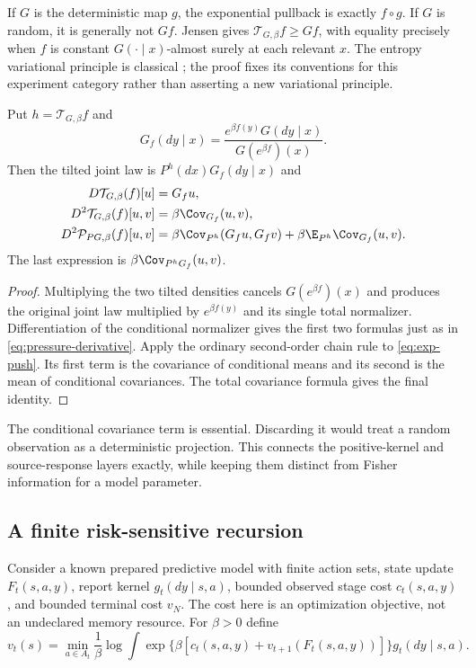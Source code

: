 If $G$ is the deterministic map $g$, the exponential pullback is exactly
$f\circ g$. If $G$ is random, it is generally not $Gf$. Jensen gives
$\mathcal T_{G,\beta}f\ge Gf$, with equality precisely when $f$ is
constant $G(\cdot\mid x)$-almost surely at each relevant $x$.
The entropy variational principle is classical
\cite{DupuisWang2007}; the proof fixes its conventions for this experiment
category rather than asserting a new variational principle.

\begin{proposition}
\label{prop:pressure-chain}
Put $h=\mathcal T_{G,\beta}f$ and
\[
 G_f(dy\mid x)=\frac{e^{\beta f(y)}G(dy\mid x)}{G(e^{\beta f})(x)}.
\]
Then the tilted joint law is $P^h(dx)G_f(dy\mid x)$ and
\begin{align*}
 D\mathcal T_{G,\beta}(f)[u]&=G_fu,\\
 D^2\mathcal T_{G,\beta}(f)[u,v]&=\beta\Cov_{G_f}(u,v),\\
 D^2\mathcal P_{PG,\beta}(f)[u,v]
 &=\beta\Cov_{P^h}(G_fu,G_fv)
   +\beta\E_{P^h}\Cov_{G_f}(u,v).
\end{align*}
The last expression is $\beta\Cov_{P^hG_f}(u,v)$.
\end{proposition}
\begin{proof}
Multiplying the two tilted densities cancels $G(e^{\beta f})(x)$ and
produces the original joint law multiplied by $e^{\beta f(y)}$ and its
single total normalizer. Differentiation of the conditional normalizer
gives the first two formulas just as in
\eqref{eq:pressure-derivative}. Apply the ordinary second-order chain
rule to \eqref{eq:exp-push}. Its first term is the covariance of
conditional means and its second is the mean of conditional covariances.
The total covariance formula gives the final identity.
\end{proof}

The conditional covariance term is essential. Discarding it would treat a
random observation as a deterministic projection. This connects the
positive-kernel and source-response layers exactly, while keeping them
distinct from Fisher information for a model parameter.

\subsection{A finite risk-sensitive recursion}
Consider a known prepared predictive model with finite action sets, state
update $F_t(s,a,y)$, report kernel $g_t(dy\mid s,a)$, bounded observed
stage cost $c_t(s,a,y)$, and bounded terminal cost $v_N$. The cost here is
an optimization objective, not an undeclared memory resource. For
$\beta>0$ define
\begin{equation}\label{eq:risk-sensitive-dp}
 v_t(s)=\min_{a\in A_t}\frac1\beta\log\int
 \exp\{\beta[c_t(s,a,y)+v_{t+1}(F_t(s,a,y))]\}
 g_t(dy\mid s,a).
\end{equation}


